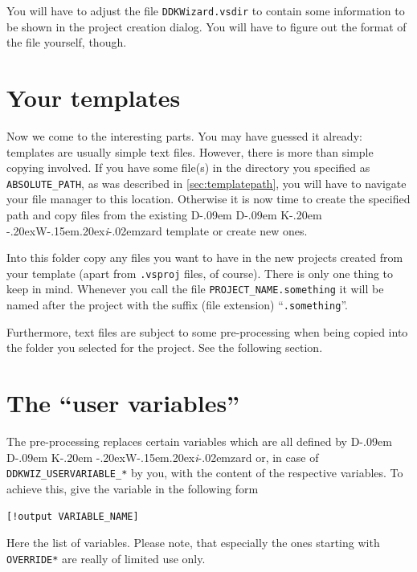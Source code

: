 \documentclass[a4paper,titlepage]{report}
\def\ddkwiz{\texorpdfstring{D\kern-.09em D\kern-.09em K\kern-.20em \raise-.20ex\hbox{W}\kern-.15em\raise.20ex\hbox{\it{i}}\kern-.02em{zard}}{DDKWizard}}
\begin{document}
You will have to adjust the file \texttt{DDKWizard.vsdir} to contain
some information to be shown in the project creation dialog. You will have to
figure out the format of the file yourself, though.

\section{Your templates}
Now we come to the interesting parts. You may have guessed it already: templates
are usually simple text files. However, there is more than simple copying involved.
If you have some file(s) in the directory you specified as \verb+ABSOLUTE_PATH+,
as was described in \autoref{sec:templatepath}, you will have to navigate your
file manager to this location. Otherwise it is now time to create the specified
path and copy files from the existing \ddkwiz{} template or create new ones.

Into this folder copy any files you want to have in the new projects
created from your template (apart from \texttt{.vsproj} files, of course).
There is only one thing to keep in mind. Whenever you call the file
\verb+PROJECT_NAME.something+ it will be named after the project with
the suffix (file extension) ``\texttt{.something}''.

Furthermore, text files are subject to some pre-processing when being copied
into the folder you selected for the project. See the following section.

\section{The ``user variables''}
The pre-processing replaces certain variables which are all defined by \ddkwiz{}
or, in case of \verb+DDKWIZ_USERVARIABLE_*+ by you, with the content of the
respective variables. To achieve this, give the variable in the following form

\begin{verbatim}
[!output VARIABLE_NAME]
\end{verbatim}

Here the list of variables. Please note, that especially the ones starting with
\verb+OVERRIDE*+ are really of limited use only.
\end{document}
